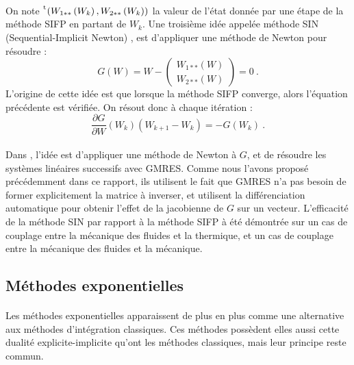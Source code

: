     \paragraph{}
    On note $\mskip1mu\prescript{\smash{\mathrm t\mkern-3mu}}{}{\mathstrut\left(W_{1**}\left(W_k\right), W_{2**}\left(W_k\right)\right)}$ la valeur de l'état donnée par une étape de la méthode SIFP en partant de $W_k$.
    Une troisième idée appelée méthode SIN (Sequential-Implicit Newton) \cite{WongKwokHorneEtAl2019}, est d'appliquer une méthode de Newton pour résoudre :
    \[G\left(W\right) = W - \begin{pmatrix}W_{1**}\left(W\right) \\ W_{2**}\left(W\right)\end{pmatrix} = 0\ .\]
    L'origine de cette idée est que lorsque la méthode SIFP converge, alors l'équation précédente est vérifiée.
    On résout donc à chaque itération :
    \[\frac{\partial G}{\partial W}\left(W_k\right)\left(W_{k+1} - W_k\right) = -G\left(W_k\right)\ .\]

    \paragraph{}
    Dans \cite{WongKwokHorneEtAl2019}, l'idée est d'appliquer une méthode de Newton à $G$, et de résoudre les systèmes linéaires successifs avec GMRES.
    Comme nous l'avons proposé précédemment dans ce rapport, ils utilisent le fait que GMRES n'a pas besoin de former explicitement la matrice à inverser, et utilisent la différenciation automatique pour obtenir l'effet de la jacobienne de $G$ sur un vecteur.
    L'efficacité de la méthode SIN par rapport à la méthode SIFP à été démontrée sur un cas de couplage entre la mécanique des fluides et la thermique, et un cas de couplage entre la mécanique des fluides et la mécanique.


  \subsection{Méthodes exponentielles}

    \paragraph{}
    Les méthodes exponentielles apparaissent de plus en plus comme une alternative aux méthodes d'intégration classiques.
    Ces méthodes possèdent elles aussi cette dualité explicite-implicite qu'ont les méthodes classiques, mais leur principe reste commun.

